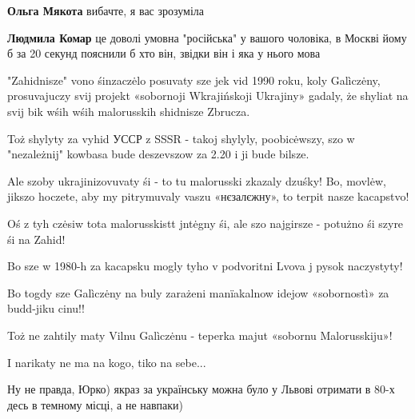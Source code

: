 \begin{itemize}
\begin{itemize}
\textbf{Ольга Мякота} вибачте, я вас зрозуміла

 
\textbf{Людмила Комар} це доволі умовна "російська" у вашого чоловіка, в Москві йому б за 20 секунд пояснили б хто він, звідки він і яка у нього мова

\end{itemize}

 

"Zahidnisze" vono śinzaczėlo posuvaty sze jek vid 1990 roku, koly Galìczėny,
prosuvajuczy svij projekt «sobornoji Wkrajińskoji Ukrajiny» gadaly, że shyliat
na svij bik wśih wśih malorusskih shidnisze Zbrucza.

Toż shylyty za vyhid УССР z SSSR - takoj shylyly, poobicėwszy, szo w
"nezależnij" kowbasa bude deszevszow za 2.20 i ji bude bilsze.

Ale szoby ukrajinizovuvaty śi - to tu malorusski zkazaly dzuśky! Bo, movlėw,
jikszo hoczete, aby my pitrymuvaly vaszu «нєзалєжну», to terpit nasze
kacapstvo!

Oś z tyh czėsiw tota malorusskistt jntėgny śi, ale szo najgirsze - potużno śi
szyre śi na Zahid!

Bo sze w 1980-h za kacapsku mogly tyho v podvoritni Lvova j pysok naczystyty!

Bo togdy sze Galìczėny na buly zarażeni manïakalnow idejow «sobornostì» za
budd-jiku cinu!!

Toż ne zahtily maty Vilnu Galìczėnu - teperka majut «sobornu Malorusskiju»!

I narikaty ne ma na kogo, tiko na sebe...

\begin{itemize}
 
Ну не правда, Юрко) якраз за українську можна було у Львові отримати в 80-х десь в темному місці, а не навпаки)


\end{itemize}
\end{itemize}
